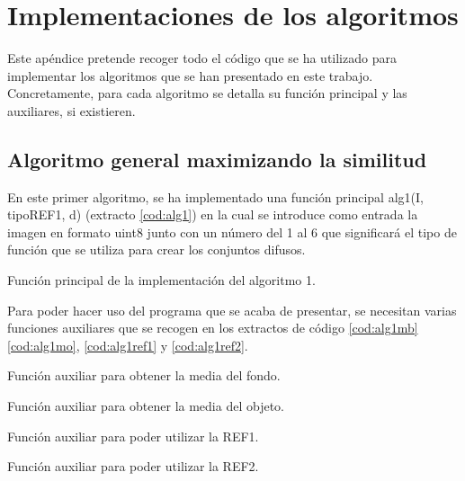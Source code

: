 \chapter{Implementaciones de los algoritmos}

Este apéndice pretende recoger todo el código que se ha utilizado para implementar los algoritmos que se han presentado en este trabajo. Concretamente, para cada algoritmo se detalla su función principal y las auxiliares, si existieren.


\section{Algoritmo general maximizando la similitud}
En este primer algoritmo, se ha implementado una función principal {\ttfamily alg1(I, tipoREF1, d)} (extracto \ref{cod:alg1}) en la cual se introduce como entrada la imagen en formato {\ttfamily uint8} junto con un número del 1 al 6 que significará el tipo de función que se utiliza para crear los conjuntos difusos.
\begin{listing}
    \caption{Función principal de la implementación del algoritmo 1.\label{cod:alg1}}
\end{listing}

Para poder hacer uso del programa que se acaba de presentar, se necesitan varias funciones auxiliares que se recogen en los extractos de código \ref{cod:alg1mb} \ref{cod:alg1mo}, \ref{cod:alg1ref1} y \ref{cod:alg1ref2}.
\newpage
\begin{listing}
    \caption{Función auxiliar para obtener la media del fondo.\label{cod:alg1mb}}
\end{listing}
\begin{listing}
    \caption{Función auxiliar para obtener la media del objeto.\label{cod:alg1mo}}
\end{listing}
\begin{listing}
    \caption{Función auxiliar para poder utilizar la REF1.\label{cod:alg1ref1}}
\end{listing}
\newpage
\begin{listing}
    \caption{Función auxiliar para poder utilizar la REF2.\label{cod:alg1ref2}}
\end{listing}

